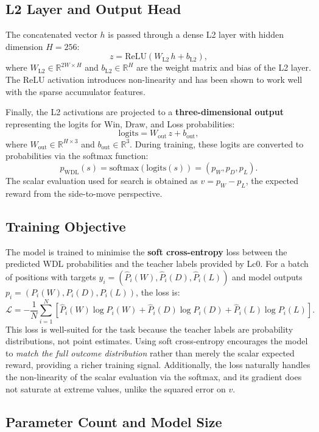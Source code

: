 \subsection{L2 Layer and Output Head}\label{sec:l2-head}

The concatenated vector \(h\) is passed through a dense L2 layer with hidden dimension \(H = 256\):
\[
z = \mathrm{ReLU}(W_{\mathrm{L2}} \, h + b_{\mathrm{L2}}),
\]
where \(W_{\mathrm{L2}} \in \mathbb{R}^{2W \times H}\) and \(b_{\mathrm{L2}} \in \mathbb{R}^H\) are the weight matrix and bias of the L2 layer. The ReLU activation introduces non-linearity and has been shown to work well with the sparse accumulator features.

Finally, the L2 activations are projected to a \textbf{three-dimensional output} representing the logits for Win, Draw, and Loss probabilities:
\[
\mathrm{logits} = W_{\mathrm{out}} \, z + b_{\mathrm{out}},
\]
where \(W_{\mathrm{out}} \in \mathbb{R}^{H \times 3}\) and \(b_{\mathrm{out}} \in \mathbb{R}^3\). During training, these logits are converted to probabilities via the softmax function:
\[
p_{\mathrm{WDL}}(s) = \mathrm{softmax}(\mathrm{logits}(s)) = (p_W, p_D, p_L).
\]
The scalar evaluation used for search is obtained as \(v = p_W - p_L\), the expected reward from the side-to-move perspective.

\subsection{Training Objective}\label{sec:training-objective}

The model is trained to minimise the \textbf{soft cross-entropy} loss between the predicted WDL probabilities and the teacher labels provided by Lc0. For a batch of positions with targets \(y_i = (\hat P_i(W), \hat P_i(D), \hat P_i(L))\) and model outputs \(p_i = (P_i(W), P_i(D), P_i(L))\), the loss is:
\[
\mathcal{L} = -\frac{1}{N} \sum_{i=1}^N \left[\hat P_i(W) \log P_i(W) + \hat P_i(D) \log P_i(D) + \hat P_i(L) \log P_i(L) \right].
\]
This loss is well-suited for the task because the teacher labels are probability distributions, not point estimates. Using soft cross-entropy encourages the model to \emph{match the full outcome distribution} rather than merely the scalar expected reward, providing a richer training signal. Additionally, the loss naturally handles the non-linearity of the scalar evaluation via the softmax, and its gradient does not saturate at extreme values, unlike the squared error on \(v\).

\subsection{Parameter Count and Model Size}\label{sec:param-count}

